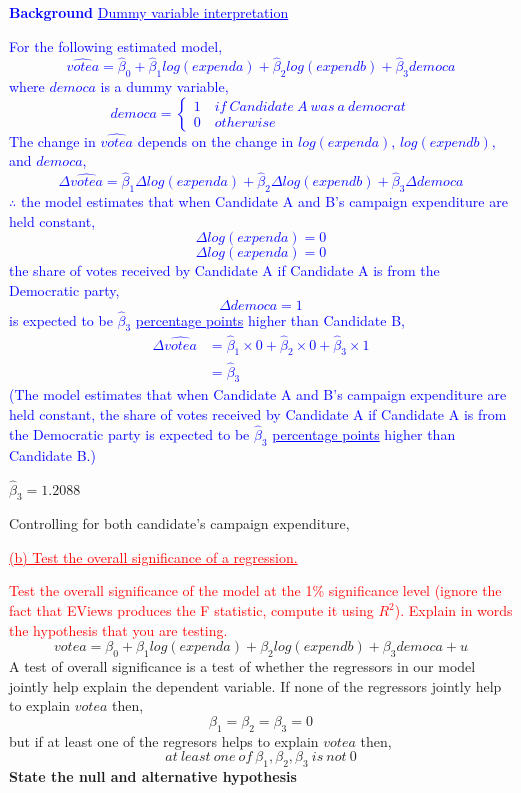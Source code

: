 \documentclass[12pt]{report}
\newenvironment{blueframed}[1][blue]
{\def\FrameCommand{\fboxsep=\FrameSep\fcolorbox{#1}{white}}%
	\MakeFramed {\advance\hsize-\width \FrameRestore}}
{\endMakeFramed}
\begin{document}
\newpage
\justify
\begin{blueframed}
	\textcolor{blue}{\textbf{Background}}
	\vspace{-\baselineskip}
	\justify
	\textcolor{blue}{\underline{Dummy variable interpretation}}
	
	\noindent \textcolor{blue} 
	{
		For the following estimated model, $$\widehat{votea} = \hat{\beta}_0 + \hat{\beta}_1log(expenda) + \hat{\beta}_2log(expendb) + \hat{\beta}_3democa$$ where $democa$ is a dummy variable, $$democa = \begin{cases}
		1 \quad if\ Candidate\ A\ was\ a\ democrat \\
		0 \quad otherwise
		\end{cases}$$ The change in $\widehat{votea}$ depends on the change in $log(expenda)$, $log(expendb)$, and $democa$, $$\Delta \widehat{votea} = \hat{\beta}_1\Delta log(expenda) + \hat{\beta}_2\Delta log(expendb) + \hat{\beta}_3\Delta democa$$ $\therefore$ the model estimates that when Candidate A and B's campaign expenditure are held constant, $$\Delta log(expenda) = 0$$ $$\Delta log(expenda) = 0$$ the share of votes received by Candidate A if Candidate A is from the Democratic party, $$\Delta democa = 1$$ is expected to be $\hat{\beta}_3$ \uline{percentage points} higher than Candidate B, \begin{align*}
		\Delta \widehat{votea} &= \hat{\beta}_1\times 0 + \hat{\beta}_2\times 0 + \hat{\beta}_3\times 1 \\
		&= \hat{\beta}_3
		\end{align*} (The model estimates that when Candidate A and B's campaign expenditure are held constant, the share of votes received by Candidate A if Candidate A is from the Democratic party is expected to be $\hat{\beta}_3$ \uline{percentage points} higher than Candidate B.)
	}
\end{blueframed}

\noindent $\hat{\beta}_3 = 1.2088$

\noindent Controlling for both candidate's campaign expenditure, 

\newpage
\noindent \textcolor{red}
{
	\uline{(b) Test the overall significance of a regression.}
}

\noindent \textcolor{red}
{
	Test the overall significance of the model at the 1\% significance level (ignore the fact that EViews produces the F statistic, compute it using $R^2$). Explain in words the hypothesis that you are testing.
}
$$votea = \beta_0 + \beta_1log(expenda) + \beta_2log(expendb) + \beta_3democa + u $$
\noindent A test of overall significance is a test of whether the regressors in our model jointly help explain the dependent variable. If none of the regressors jointly help to explain $votea$ then,
$$\beta_1 = \beta_2 = \beta_3 = 0$$
but if at least one of the regresors helps to explain $votea$ then,
$$at\ least\ one\ of\ \beta_1, \beta_2, \beta_3\ is\ not\ 0$$
\noindent \textbf{State the null and alternative hypothesis}
\vspace{20mm}
\end{document}
